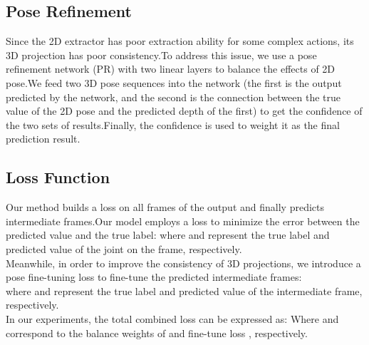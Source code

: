 \documentclass{article}
\begin{document}
\subsection{Pose Refinement}
Since the 2D extractor has poor extraction ability for some complex actions, its 3D projection has poor consistency.To address this issue, we use a pose refinement network (PR) with two linear layers to balance the effects of 2D pose.We feed two 3D pose sequences into the network (the first is the output predicted by the network, and the second is the connection between the true value of the 2D pose and the predicted depth of the first) to get the confidence of the two sets of results.Finally, the confidence is used to weight it as the final prediction result.

\subsection{Loss Function}
Our method builds a loss on all frames of the output and finally predicts intermediate frames.Our model employs a  loss to minimize the error between the predicted value and the true label: where  and  represent the true label and predicted value of the  joint on the  frame, respectively.\\
Meanwhile, in order to improve the consistency of 3D projections, we introduce a pose fine-tuning loss  to fine-tune the predicted intermediate frames:\\
where  and  represent the true label and predicted value of the intermediate frame, respectively.\\
In our experiments, the total combined loss can be expressed as:
Where  and  correspond to the balance weights of  and fine-tune loss , respectively.
\newpage
\end{document}

